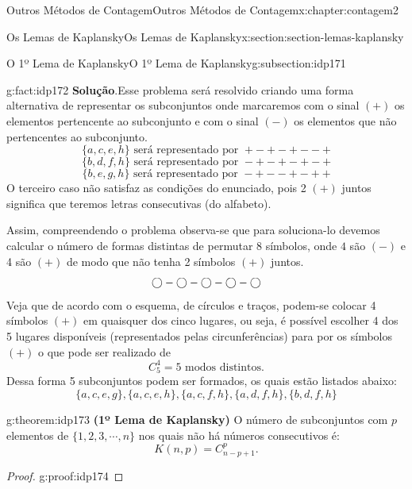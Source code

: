 \documentclass[oneside,10pt,]{book}
\newcommand{\blocktitlefont}{\relax}
\newcommand{\terminology}[1]{\textbf{#1}}
\numberwithin{equation}{section}
\begin{document}
\begin{chapterptx}{Outros Métodos de Contagem}{}{Outros Métodos de Contagem}{}{}{x:chapter:contagem2}
\begin{sectionptx}{Os Lemas de Kaplansky}{}{Os Lemas de Kaplansky}{}{}{x:section:section-lemas-kaplansky}
\begin{subsectionptx}{O 1º Lema de Kaplansky}{}{O 1º Lema de Kaplansky}{}{}{g:subsection:idp171}
\begin{fact}{}{}{g:fact:idp172}
\textbf{\blocktitlefont Solução}.\quad{}Esse problema será resolvido criando uma forma alternativa de representar os subconjuntos onde marcaremos com o sinal \((+)\) os elementos pertencente ao subconjunto e com o sinal \((-)\) os elementos que não pertencentes ao subconjunto.%
\begin{equation*}
\{a,c,e,h\} \text{ será representado  por } +-+-+--+
\end{equation*}
%
\begin{equation*}
\{b,d,f,h\} \text{ será representado  por } -+-+-+-+
\end{equation*}
%
\begin{equation*}
\{b,e,g,h\} \text{ será representado  por } -+--+-++
\end{equation*}
O terceiro caso não satisfaz as condições do enunciado, pois 2 \((+)\) juntos significa que teremos letras consecutivas (do alfabeto).%
\par
Assim, compreendendo o problema observa-se que para soluciona-lo devemos calcular o número de formas distintas de permutar 8 símbolos, onde \(4\) são \((-)\) e 4 são \((+)\) de modo que não tenha 2 símbolos \((+)\) juntos.%
\begin{equation*}
\LARGE \bigcirc-\bigcirc-\bigcirc-\bigcirc-\bigcirc
\end{equation*}
Veja que de acordo com  o esquema, de círculos e traços, podem-se colocar 4 símbolos \((+)\) em quaisquer dos cinco lugares, ou seja, é possível escolher 4 dos 5 lugares disponíveis (representados pelas circunferências) para por os símbolos \((+)\) o que pode ser realizado de%
\begin{equation*}
C_5^4=5 \text{ modos distintos}.
\end{equation*}
Dessa forma 5 subconjuntos podem ser formados, os quais estão listados abaixo:%
\begin{equation*}
\{ a, c, e, g \}, \{ a, c, e, h \}, \{ a, c, f, h \}, \{ a, d, f, h \}, \{ b, d, f, h \} 
\end{equation*}
%
\end{fact}
\begin{theorem}{}{}{g:theorem:idp173}%
\terminology{(1º Lema de Kaplansky)} O número de subconjuntos com \(p\) elementos de \(\{1,2,3,\cdots,n\}\) nos quais não há números consecutivos é:%
\begin{equation*}
K(n,p)=C_{n-p+1}^p.
\end{equation*}
%
\end{theorem}
\begin{proof}{}{g:proof:idp174}

\end{proof}
\end{subsectionptx}
\end{sectionptx}
\end{chapterptx}
\end{document}
